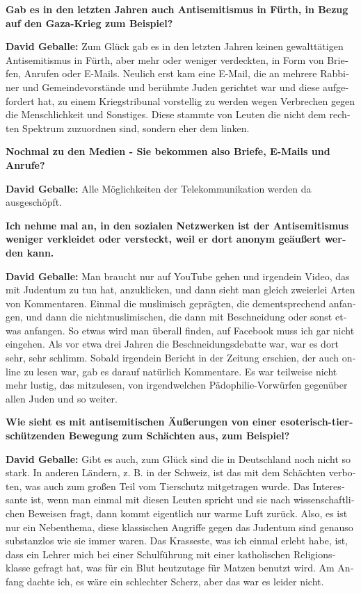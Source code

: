 \begin{otherlanguage}{ngerman}
\textbf{Gab es in den letzten Jahren auch Antisemitismus in Fürth, in Bezug auf den Gaza-Krieg zum Beispiel?} 

\textbf{David Geballe:} Zum Glück gab es in den letzten Jahren keinen gewalttätigen Antisemitismus in Fürth, aber mehr oder weniger verdeckten, in Form von Briefen, Anrufen oder E-Mails. Neulich erst kam eine E-Mail, die an mehrere Rabbiner und Gemeindevorstände und berühmte Juden gerichtet war und diese aufgefordert hat, zu einem Kriegstribunal vorstellig zu werden wegen Verbrechen gegen die Menschlichkeit und Sonstiges. Diese stammte von Leuten die nicht dem rechten Spektrum zuzuordnen sind, sondern eher dem linken. 

\textbf{Nochmal zu den Medien - Sie bekommen also Briefe, E-Mails und Anrufe?} 

\textbf{David Geballe:} Alle Möglichkeiten der Telekommunikation werden da ausgeschöpft. 

\textbf{Ich nehme mal an, in den sozialen Netzwerken ist der Antisemitismus weniger verkleidet oder versteckt, weil er dort anonym geäußert werden kann.} 

\textbf{David Geballe:} Man braucht nur auf YouTube gehen und irgendein Video, das mit Judentum zu tun hat, anzuklicken, und dann sieht man gleich zweierlei Arten von Kommentaren. Einmal die muslimisch geprägten, die dementsprechend anfangen, und dann die nichtmuslimischen, die dann mit Beschneidung oder sonst etwas anfangen. So etwas wird man überall finden, auf Facebook muss ich gar nicht eingehen. Als vor etwa drei Jahren die Beschneidungsdebatte war, war es dort sehr, sehr schlimm. Sobald irgendein Bericht in der Zeitung erschien, der auch online zu lesen war, gab es darauf natürlich Kommentare. Es war teilweise nicht mehr lustig, das mitzulesen, von irgendwelchen Pädophilie-Vorwürfen gegenüber allen Juden und so weiter. 

\textbf{Wie sieht es mit antisemitischen Äußerungen von einer esoterisch-tierschützenden Bewegung zum Schächten aus, zum Beispiel?}

\textbf{David Geballe:} Gibt es auch, zum Glück sind die in Deutschland noch nicht so stark. In anderen Ländern, z. B. in der Schweiz, ist das mit dem Schächten verboten, was auch zum großen Teil vom Tierschutz mitgetragen wurde. Das Interessante ist, wenn man einmal mit diesen Leuten spricht und sie nach wissenschaftlichen Beweisen fragt, dann kommt eigentlich nur warme Luft zurück. Also, es ist nur ein Nebenthema, diese klassischen Angriffe gegen das Judentum sind genauso substanzlos wie sie immer waren. Das Krasseste, was ich einmal erlebt habe, ist, dass ein Lehrer mich bei einer Schulführung mit einer katholischen Religionsklasse gefragt hat, was für ein Blut heutzutage für Matzen benutzt wird. Am Anfang dachte ich, es wäre ein schlechter Scherz, aber das war es leider nicht. 


\end{otherlanguage}

